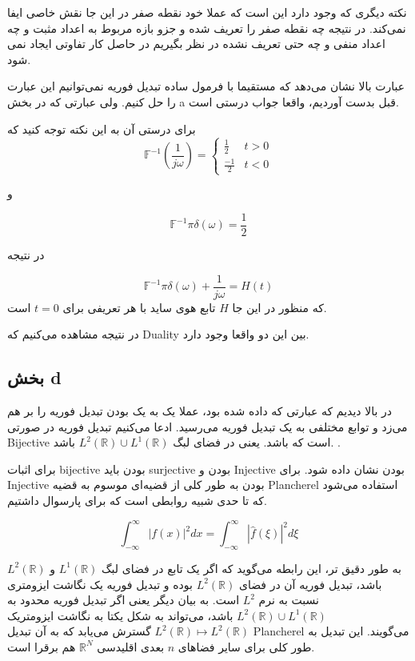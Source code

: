 \documentclass[12pt]{article}
\begin{document}
نکته دیگری که وجود دارد این است که عملا خود نقطه صفر در این جا نقش خاصی ایفا نمی‌کند. در نتیجه چه نقطه صفر را تعریف شده و جزو بازه مربوط به اعداد مثبت و چه اعداد منفی و چه حتی تعریف نشده در نظر بگیریم در حاصل کار تفاوتی ایجاد نمی شود.

عبارت بالا نشان می‌دهد که مستقیما با فرمول ساده تبدیل فوریه نمی‌توانیم این عبارت را حل کنیم. ولی عبارتی که در بخش a قبل بدست آوردیم،‌ واقعا جواب درستی است.

برای درستی آن به این نکته توجه کنید که
$$\mathbb{F}^{-1} (\frac{1}{j\omega}) = \left\{\begin{array}{ll}
	\frac{1}{2} & t > 0 \\
	\frac{-1}{2} & t<0
\end{array}\right.$$

و

$$\mathbb{F}^{-1}{\pi \delta(\omega) } = \frac{1}{2}$$

در نتیجه

$$\mathbb{F}^{-1}{\pi \delta(\omega) + \frac{1}{j\omega}} = H(t)$$
که منظور در این جا $H$ تابع هوی ساید با هر تعریفی برای $t=0$ است.

در نتیجه مشاهده می‌کنیم که Duality بین این دو واقعا وجود دارد.


\subsection{بخش d}


در بالا دیدیم که عبارتی که داده شده بود، عملا یک به یک بودن تبدیل فوریه را بر هم می‌زد و توابع مختلفی به یک تبدیل فوریه می‌رسید. ادعا می‌کنیم تبدیل فوریه در صورتی Bijective است که  باشد. یعنی در فضای
 لبگ
  $L^2(\mathbb{R}) \cup L^1(\mathbb{R})$
   باشد.
 .

 

برای اثبات bijective بودن باید surjective بودن و Injective بودن نشان داده شود. برای Injective بودن به طور کلی از قضیه‌ای موسوم به قضیه Plancherel استفاده می‌شود که تا حدی شبیه روابطی است که برای پارسوال داشتیم.


$$
\int_{-\infty}^{\infty}|f(x)|^{2} d x=\int_{-\infty}^{\infty}|\widehat{f}(\xi)|^{2} d \xi
$$

به طور دقیق تر، این رابطه می‌گوید که اگر یک تابع در فضای لبگ $L^1(\mathbb{R})$ و $L^2(\mathbb{R})$ باشد، تبدیل فوریه آن در فضای 
$L^2(\mathbb{R})$
بوده و تبدیل فوریه یک نگاشت ایزومتری نسبت به نرم $L^2$ است. به بیان دیگر یعنی اگر تبدیل فوریه محدود به
 $L^2(\mathbb{R}) \cup L^1(\mathbb{R})$
 باشد، می‌تواند به شکل یکتا به نگاشت ایزومتریک 
 $
 L^{2}(\mathbb{R}) \mapsto L^{2}(\mathbb{R})
 $
 گسترش می‌یابد که به آن تبدیل Plancherel می‌گویند. این تبدیل به طور کلی برای سایر فضاهای $n$ بعدی اقلیدسی $\mathbb{R}^N$ هم برقرا است.
 
\end{document}
